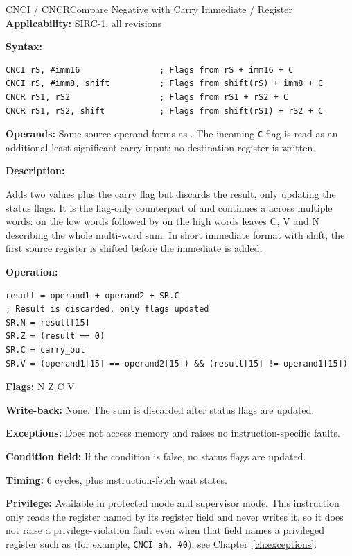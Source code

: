 \begin{instructionbox}{CNCI / CNCR}{Compare Negative with Carry Immediate / Register}
	\textbf{Applicability:} SIRC-1, all revisions

	\textbf{Syntax:}
	\begin{lstlisting}
CNCI rS, #imm16                ; Flags from rS + imm16 + C
CNCI rS, #imm8, shift          ; Flags from shift(rS) + imm8 + C
CNCR rS1, rS2                  ; Flags from rS1 + rS2 + C
CNCR rS1, rS2, shift           ; Flags from shift(rS1) + rS2 + C
\end{lstlisting}

	\textbf{Operands:} Same source operand forms as . The incoming \texttt{C} flag is read as an additional
	least-significant carry input; no destination register is written.

	\textbf{Description:}

	Adds two values plus the carry flag but discards the result, only updating the status flags. It is the flag-only
	counterpart of  and continues a  across multiple words:  on the low words
	followed by  on the high words leaves C, V and N describing the whole multi-word sum. In short immediate
	format with shift, the first source register is shifted before the immediate is added.

	\textbf{Operation:}
	\begin{verbatim}
result = operand1 + operand2 + SR.C
; Result is discarded, only flags updated
SR.N = result[15]
SR.Z = (result == 0)
SR.C = carry_out
SR.V = (operand1[15] == operand2[15]) && (result[15] != operand1[15])
\end{verbatim}

	\textbf{Flags:} N Z C V

	\textbf{Write-back:} None. The sum is discarded after status flags are updated.

	\textbf{Exceptions:} Does not access memory and raises no instruction-specific faults.

	\textbf{Condition field:} If the condition is false, no status flags are updated.

	\textbf{Timing:} 6 cycles, plus instruction-fetch wait states.

	\textbf{Privilege:} Available in protected mode and supervisor mode. This instruction only reads the register named
	by its register field and never writes it, so it does not raise a privilege-violation fault even when that field
	names a privileged register such as  (for example, \texttt{CNCI ah, \#0}); see
	Chapter~\ref{ch:exceptions}.


\end{instructionbox}
